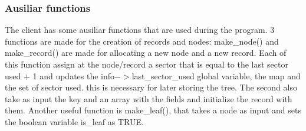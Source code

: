 \subsubsection{Ausiliar functions}
The client has some ausiliar functions that are used during the program. 
3 functions are made for the creation of records and nodes: make\_node() and make\_record() are made for allocating a new node and a new record.
Each of this function assign at the node/record a sector that is equal to the last sector used + 1 and updates the info$->$last\_sector\_used global variable, the map and the set of sector used. this is necessary for later storing the tree. The second also take as input the key and an array with the fields and initialize the record with them. Another useful function is make\_leaf(), that takes a node as input and sets the boolean variable is\_leaf as TRUE.

